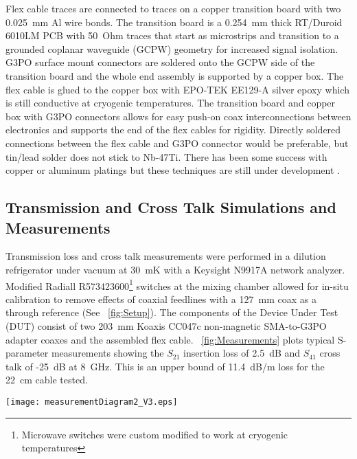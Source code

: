 Flex cable traces are connected to traces on a copper transition board with two 0.025~mm Al wire bonds. The transition board is a 0.254~mm thick RT/Duroid 6010LM PCB with 50~Ohm traces that start as microstrips and transition to a grounded coplanar waveguide (GCPW) geometry for increased signal isolation. G3PO surface mount connectors are soldered onto the GCPW side of the transition board and the whole end assembly is supported by a copper box. The flex cable is glued to the copper box with EPO-TEK EE129-A silver epoxy which is still conductive at cryogenic temperatures. The transition board and copper box with G3PO connectors allows for easy push-on coax interconnections between electronics and supports the end of the flex cables for rigidity. Directly soldered connections between the flex cable and G3PO connector would be preferable, but tin/lead solder does not stick to Nb-47Ti. There has been some success with copper or aluminum platings but these techniques are still under development \parencite{MiguelThesis}.

\subsection{Transmission and Cross Talk Simulations and Measurements}  \label{sec:measurements}
Transmission loss and cross talk measurements were performed in a dilution refrigerator under vacuum at 30~mK with a Keysight N9917A network analyzer. Modified Radiall R573423600\footnote{Microwave switches were custom modified to work at cryogenic temperatures} switches at the mixing chamber allowed for in-situ calibration to remove effects of coaxial feedlines with a 127~mm coax as a through reference (See \figurename~\ref{fig:Setup}). The components of the Device Under Test (DUT) consist of two 203~mm Koaxis CC047c non-magnetic SMA-to-G3PO adapter coaxes and the assembled flex cable. \figurename~\ref{fig:Measurements} plots typical S-parameter measurements showing the $S_{21}$ insertion loss of 2.5~dB and $S_{41}$ cross talk of -25~dB at 8~GHz. This is an upper bound of 11.4~dB/m loss for the 22~cm cable tested. 

\begin{figure*}[!t]
    \centering
      \texttt{[image: measurementDiagram2\_V3.eps]}
    \caption[Flex cable measurement diagram]{Diagram of the $S_{21}$ microwave measurement setup at the mixing chamber of the dilution refrigerator. The Device Under Test (DUT) consists of 203~mm Koaxis SMA-to-G3PO coaxes and the flex cable assembly including the microstrip flex circuit, wirebonds, transition boards, and G3PO edge mount connectors. Disconnected traces on the flex cable were terminated with $\rm 50~\Omega$ loads. The SMA switches allow for an in-situ through calibration without interrupting the dilution cooling cycle. $S_{41}$ is measured during a separate cool down.}
    \label{fig:Setup}
\end{figure*}

